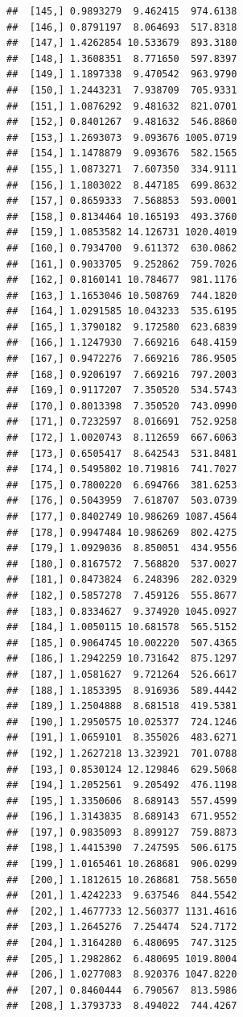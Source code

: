 \documentclass[article]{jss}\usepackage[]{graphicx}\usepackage[]{xcolor}
\makeatletter
\newenvironment{kframe}{%
 \def\at@end@of@kframe{}%
 \ifinner\ifhmode%
  \def\at@end@of@kframe{\end{minipage}}%
  \begin{minipage}{\columnwidth}%
 \fi\fi%
 \def\FrameCommand##1{\hskip\@totalleftmargin \hskip-\fboxsep
 \colorbox{shadecolor}{##1}\hskip-\fboxsep
     \hskip-\linewidth \hskip-\@totalleftmargin \hskip\columnwidth}%
 \MakeFramed {\advance\hsize-\width
   \@totalleftmargin\z@ \linewidth\hsize
   \@setminipage}}%
 {\par\unskip\endMakeFramed%
 \at@end@of@kframe}
\newenvironment{knitrout}{}{} %
\makeatother
\begin{document}
\begin{knitrout}
\begin{kframe}
\begin{verbatim}
##  [145,] 0.9893279  9.462415  974.6138
##  [146,] 0.8791197  8.064693  517.8318
##  [147,] 1.4262854 10.533679  893.3180
##  [148,] 1.3608351  8.771650  597.8397
##  [149,] 1.1897338  9.470542  963.9790
##  [150,] 1.2443231  7.938709  705.9331
##  [151,] 1.0876292  9.481632  821.0701
##  [152,] 0.8401267  9.481632  546.8860
##  [153,] 1.2693073  9.093676 1005.0719
##  [154,] 1.1478879  9.093676  582.1565
##  [155,] 1.0873271  7.607350  334.9111
##  [156,] 1.1803022  8.447185  699.8632
##  [157,] 0.8659333  7.568853  593.0001
##  [158,] 0.8134464 10.165193  493.3760
##  [159,] 1.0853582 14.126731 1020.4019
##  [160,] 0.7934700  9.611372  630.0862
##  [161,] 0.9033705  9.252862  759.7026
##  [162,] 0.8160141 10.784677  981.1176
##  [163,] 1.1653046 10.508769  744.1820
##  [164,] 1.0291585 10.043233  535.6195
##  [165,] 1.3790182  9.172580  623.6839
##  [166,] 1.1247930  7.669216  648.4159
##  [167,] 0.9472276  7.669216  786.9505
##  [168,] 0.9206197  7.669216  797.2003
##  [169,] 0.9117207  7.350520  534.5743
##  [170,] 0.8013398  7.350520  743.0990
##  [171,] 0.7232597  8.016691  752.9258
##  [172,] 1.0020743  8.112659  667.6063
##  [173,] 0.6505417  8.642543  531.8481
##  [174,] 0.5495802 10.719816  741.7027
##  [175,] 0.7800220  6.694766  381.6253
##  [176,] 0.5043959  7.618707  503.0739
##  [177,] 0.8402749 10.986269 1087.4564
##  [178,] 0.9947484 10.986269  802.4275
##  [179,] 1.0929036  8.850051  434.9556
##  [180,] 0.8167572  7.568820  537.0027
##  [181,] 0.8473824  6.248396  282.0329
##  [182,] 0.5857278  7.459126  555.8677
##  [183,] 0.8334627  9.374920 1045.0927
##  [184,] 1.0050115 10.681578  565.5152
##  [185,] 0.9064745 10.002220  507.4365
##  [186,] 1.2942259 10.731642  875.1297
##  [187,] 1.0581627  9.721264  526.6617
##  [188,] 1.1853395  8.916936  589.4442
##  [189,] 1.2504888  8.681518  419.5381
##  [190,] 1.2950575 10.025377  724.1246
##  [191,] 1.0659101  8.355026  483.6271
##  [192,] 1.2627218 13.323921  701.0788
##  [193,] 0.8530124 12.129846  629.5068
##  [194,] 1.2052561  9.205492  476.1198
##  [195,] 1.3350606  8.689143  557.4599
##  [196,] 1.3143835  8.689143  671.9552
##  [197,] 0.9835093  8.899127  759.8873
##  [198,] 1.4415390  7.247595  506.6175
##  [199,] 1.0165461 10.268681  906.0299
##  [200,] 1.1812615 10.268681  758.5650
##  [201,] 1.4242233  9.637546  844.5542
##  [202,] 1.4677733 12.560377 1131.4616
##  [203,] 1.2645276  7.254474  524.7172
##  [204,] 1.3164280  6.480695  747.3125
##  [205,] 1.2982862  6.480695 1019.8004
##  [206,] 1.0277083  8.920376 1047.8220
##  [207,] 0.8460444  6.790567  813.5986
##  [208,] 1.3793733  8.494022  744.4267

\end{verbatim}
\end{kframe}
\end{knitrout}
\end{document}
